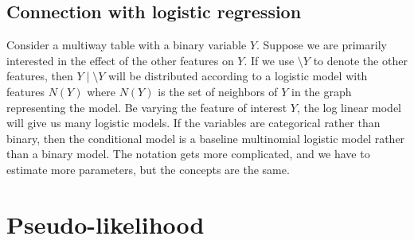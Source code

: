 \subsection{Connection with logistic regression}
Consider a multiway table with a binary variable $Y$. Suppose we are primarily interested in the effect of the other features on $Y$. If we use $\setminus Y$ to denote the other features, then $Y\mid \setminus Y$ will be distributed according to a logistic model with features $N(Y)$ where $N(Y)$ is the set of neighbors of $Y$ in the graph representing the model. Be varying the feature of interest $Y$, the log linear model will give us many logistic models.  If the variables are categorical rather than binary, then the conditional model is a baseline multinomial logistic model rather than a binary model. The notation gets more complicated, and we have to estimate more parameters, but the concepts are the same. 

\section{Pseudo-likelihood}
